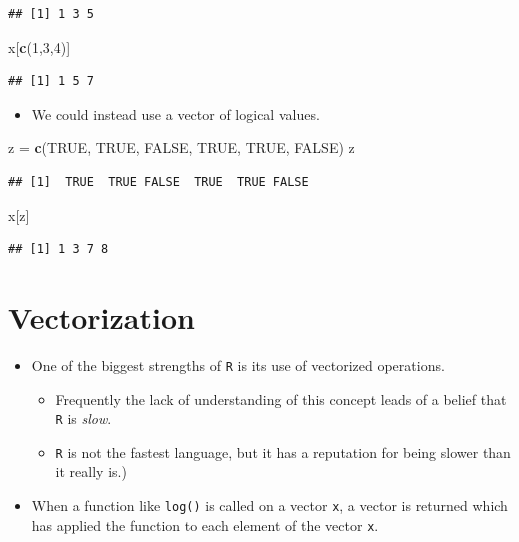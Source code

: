 \documentclass[]{book}
\newenvironment{Shaded}{\begin{snugshade}}{\end{snugshade}}
\newcommand{\KeywordTok}[1]{\textcolor[rgb]{0.13,0.29,0.53}{\textbf{#1}}}
\newcommand{\DecValTok}[1]{\textcolor[rgb]{0.00,0.00,0.81}{#1}}
\newcommand{\StringTok}[1]{\textcolor[rgb]{0.31,0.60,0.02}{#1}}
\newcommand{\OtherTok}[1]{\textcolor[rgb]{0.56,0.35,0.01}{#1}}
\newcommand{\NormalTok}[1]{#1}
\providecommand{\tightlist}{%
  \setlength{\itemsep}{0pt}\setlength{\parskip}{0pt}}
\begin{document}
\begin{verbatim}
## [1] 1 3 5
\end{verbatim}

\begin{Shaded}
\begin{Highlighting}[]
\NormalTok{x[}\KeywordTok{c}\NormalTok{(}\DecValTok{1}\NormalTok{,}\DecValTok{3}\NormalTok{,}\DecValTok{4}\NormalTok{)]}
\end{Highlighting}
\end{Shaded}

\begin{verbatim}
## [1] 1 5 7
\end{verbatim}

\begin{itemize}
\tightlist
\item
  We could instead use a vector of logical values.
\end{itemize}

\begin{Shaded}
\begin{Highlighting}[]
\NormalTok{z =}\StringTok{ }\KeywordTok{c}\NormalTok{(}\OtherTok{TRUE}\NormalTok{, }\OtherTok{TRUE}\NormalTok{, }\OtherTok{FALSE}\NormalTok{, }\OtherTok{TRUE}\NormalTok{, }\OtherTok{TRUE}\NormalTok{, }\OtherTok{FALSE}\NormalTok{)}
\NormalTok{z}
\end{Highlighting}
\end{Shaded}

\begin{verbatim}
## [1]  TRUE  TRUE FALSE  TRUE  TRUE FALSE
\end{verbatim}

\begin{Shaded}
\begin{Highlighting}[]
\NormalTok{x[z]}
\end{Highlighting}
\end{Shaded}

\begin{verbatim}
## [1] 1 3 7 8
\end{verbatim}

\section{Vectorization}\label{vectorization}

\begin{itemize}
\tightlist
\item
  One of the biggest strengths of \texttt{R} is its use of vectorized
  operations.

  \begin{itemize}
  \tightlist
  \item
    Frequently the lack of understanding of this concept leads of a
    belief that \texttt{R} is \emph{slow}.
  \item
    \texttt{R} is not the fastest language, but it has a reputation for
    being slower than it really is.)
  \end{itemize}
\item
  When a function like \texttt{log()} is called on a vector \texttt{x},
  a vector is returned which has applied the function to each element of
  the vector \texttt{x}.
\end{itemize}
\end{document}
